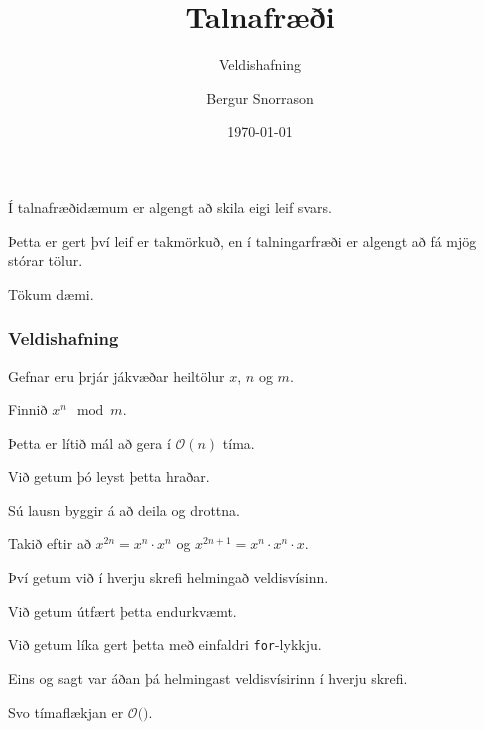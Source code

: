 \title{Talnafræði}
\subtitle{Veldishafning}
\author{Bergur Snorrason}
\date{\today}



\frame{\titlepage}

{
	{
		\item<1-> Í talnafræðidæmum er algengt að skila eigi leif svars.
		\item<2-> Þetta er gert því leif er takmörkuð, en í talningarfræði er algengt að fá mjög stórar tölur.
		\item<3-> Tökum dæmi.
	}
}

{
	\frametitle{Veldishafning}
	{
		\item<1-> Gefnar eru þrjár jákvæðar heiltölur $x$, $n$ og $m$.
		\item<2-> Finnið $x^n \mod m$.
	}
}

{
	{
		\item<1-> Þetta er lítið mál að gera í $\mathcal{O}(n)$ tíma.
		\item<2->[] 
		\item<3-> Við getum þó leyst þetta hraðar.
		\item<4-> Sú lausn byggir á að deila og drottna.
		\item<5-> Takið eftir að $x^{2n} = x^n \cdot x^n$ og $x^{2n + 1} = x^n \cdot x^n \cdot x$.
		\item<6-> Því getum við í hverju skrefi helmingað veldisvísinn.
	}
}

{
	{
		\item<1-> Við getum útfært þetta endurkvæmt.
		\item<2->[] 
		\item<3-> Við getum líka gert þetta með einfaldri \texttt{for}-lykkju.
		\item<4->[] 
	}
}

{
	{
		\item<1-> Eins og sagt var áðan þá helmingast veldisvísirinn í hverju skrefi.
		\item<2-> Svo tímaflækjan er $\mathcal{O}($\onslide<3->{$\log n$}$)$.
	}
}

{
}


